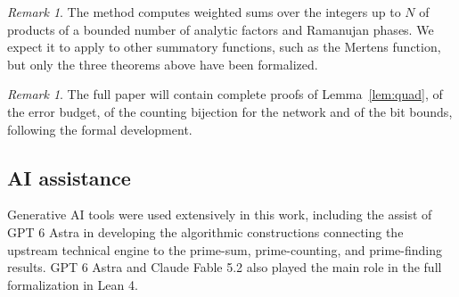 \documentclass[11pt]{amsart}
\theoremstyle{remark}
\newtheorem{remark}[theorem]{Remark}
\begin{document}
\begin{remark}
The method computes weighted sums over the integers up to $N$ of products of
a bounded number of analytic factors and Ramanujan phases.  We expect it to
apply to other summatory functions, such as the Mertens function, but only
the three theorems above have been formalized.
\end{remark}

\begin{remark}
The full paper will contain complete proofs of Lemma~\ref{lem:quad}, of the
error budget, of the counting bijection for the network and of the bit
bounds, following the formal development.
\end{remark}

\subsection*{AI assistance}
Generative AI tools were used extensively in this work, including the assist of GPT 6 Astra in developing the algorithmic constructions connecting the upstream technical engine to the prime-sum, prime-counting, and prime-finding results. 
GPT 6 Astra and Claude Fable 5.2 also played the main role in the full formalization in Lean 4.
\end{document}
